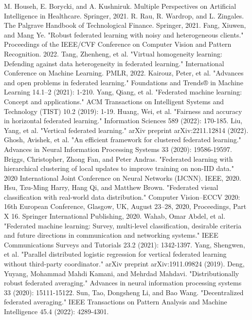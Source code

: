 \documentclass[conference]{IEEEtran}
\begin{document}
\begin{thebibliography}{00}
     M. Househ, E. Borycki, and A. Kushniruk. Multiple Perspectives on Artificial Intelligence in Healthcare. Springer, 2021.
     R. Rau, R. Wardrop, and L. Zingales. The Palgrave Handbook of Technological Finance. Springer, 2021.
     Fang, Xiuwen, and Mang Ye. "Robust federated learning with noisy and heterogeneous clients." Proceedings of the IEEE/CVF Conference on Computer Vision and Pattern Recognition. 2022.
     Tang, Zhenheng, et al. "Virtual homogeneity learning: Defending against data heterogeneity in federated learning." International Conference on Machine Learning. PMLR, 2022.
     Kairouz, Peter, et al. "Advances and open problems in federated learning." Foundations and Trends® in Machine Learning 14.1–2 (2021): 1-210.
     Yang, Qiang, et al. "Federated machine learning: Concept and applications." ACM Transactions on Intelligent Systems and Technology (TIST) 10.2 (2019): 1-19.
     Huang, Wei, et al. "Fairness and accuracy in horizontal federated learning." Information Sciences 589 (2022): 170-185.
     Liu, Yang, et al. "Vertical federated learning." arXiv preprint arXiv:2211.12814 (2022).
     Ghosh, Avishek, et al. "An efficient framework for clustered federated learning." Advances in Neural Information Processing Systems 33 (2020): 19586-19597.
     Briggs, Christopher, Zhong Fan, and Peter Andras. "Federated learning with hierarchical clustering of local updates to improve training on non-IID data." 2020 International Joint Conference on Neural Networks (IJCNN). IEEE, 2020.
     Hsu, Tzu-Ming Harry, Hang Qi, and Matthew Brown. "Federated visual classification with real-world data distribution." Computer Vision–ECCV 2020: 16th European Conference, Glasgow, UK, August 23–28, 2020, Proceedings, Part X 16. Springer International Publishing, 2020.
     Wahab, Omar Abdel, et al. "Federated machine learning: Survey, multi-level classification, desirable criteria and future directions in communication and networking systems." IEEE Communications Surveys and Tutorials 23.2 (2021): 1342-1397.
     Yang, Shengwen, et al. "Parallel distributed logistic regression for vertical federated learning without third-party coordinator." arXiv preprint arXiv:1911.09824 (2019).
     Deng, Yuyang, Mohammad Mahdi Kamani, and Mehrdad Mahdavi. "Distributionally robust federated averaging." Advances in neural information processing systems 33 (2020): 15111-15122.
     Sun, Tao, Dongsheng Li, and Bao Wang. "Decentralized federated averaging." IEEE Transactions on Pattern Analysis and Machine Intelligence 45.4 (2022): 4289-4301.

\end{thebibliography}
\end{document}
